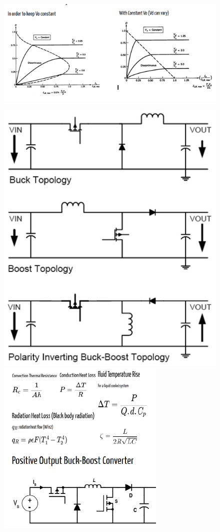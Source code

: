 \documentclass[twocolumn, ]{article}
\begin{document}
\begin{figure}[!ht]
	\includegraphics[scale=0.7]{bla}

\includegraphics[scale=0.3]{topo}
\hspace{0.2 cm}
\includegraphics[scale=0.6]{posbb}
\end{figure}
\end{document}
